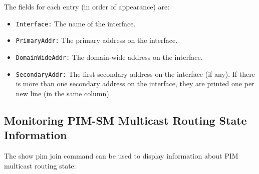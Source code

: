 The fields for each entry (in order of appearance) are:
\begin{itemize}

  \item {\tt Interface:} The name of the interface.

  \item {\tt PrimaryAddr:} The primary address on the interface.

  \item {\tt DomainWideAddr:} The domain-wide address on the interface.

  \item {\tt SecondaryAddr:} The first secondary address on the interface
  (if any). If there is more than one secondary address on the interface,
  they are printed one per new line (in the same column).

\end{itemize}

\newpage
\subsection{Monitoring PIM-SM Multicast Routing State Information}

The {\stt show pim join} command can be used to display
information about PIM multicast routing state:


